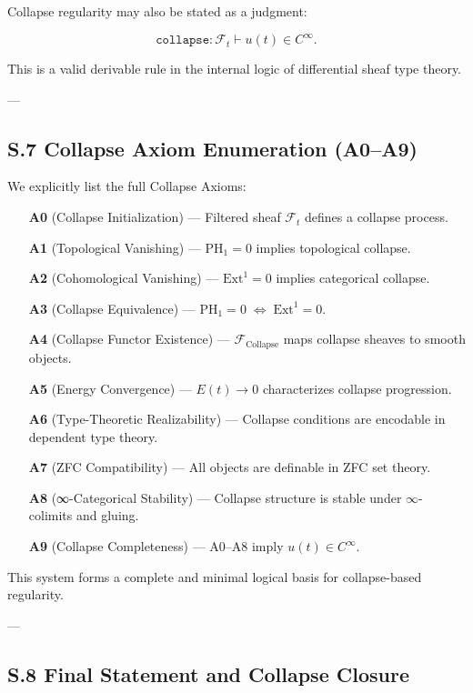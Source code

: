 \documentclass[11pt]{article}
\begin{document}
Collapse regularity may also be stated as a judgment:

\[
\texttt{collapse} : \mathcal{F}_t \vdash u(t) \in C^\infty.
\]

This is a valid derivable rule in the internal logic of differential sheaf type theory.

---

\subsection*{S.7 Collapse Axiom Enumeration (A0–A9)}

We explicitly list the full Collapse Axioms:

\begin{itemize}
  \item[\textbf{A0}] (Collapse Initialization) — Filtered sheaf $\mathcal{F}_t$ defines a collapse process.
  \item[\textbf{A1}] (Topological Vanishing) — $\mathrm{PH}_1 = 0$ implies topological collapse.
  \item[\textbf{A2}] (Cohomological Vanishing) — $\mathrm{Ext}^1 = 0$ implies categorical collapse.
  \item[\textbf{A3}] (Collapse Equivalence) — $\mathrm{PH}_1 = 0 \;\Leftrightarrow\; \mathrm{Ext}^1 = 0$.
  \item[\textbf{A4}] (Collapse Functor Existence) — $\mathcal{F}_{\mathrm{Collapse}}$ maps collapse sheaves to smooth objects.
  \item[\textbf{A5}] (Energy Convergence) — $E(t) \to 0$ characterizes collapse progression.
  \item[\textbf{A6}] (Type-Theoretic Realizability) — Collapse conditions are encodable in dependent type theory.
  \item[\textbf{A7}] (ZFC Compatibility) — All objects are definable in ZFC set theory.
  \item[\textbf{A8}] (∞-Categorical Stability) — Collapse structure is stable under $\infty$-colimits and gluing.
  \item[\textbf{A9}] (Collapse Completeness) — A0–A8 imply $u(t) \in C^\infty$.
\end{itemize}

This system forms a complete and minimal logical basis for collapse-based regularity.

---

\subsection*{S.8 Final Statement and Collapse Closure}
\end{document}
